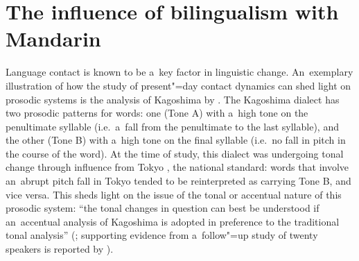 

\section{The influence of bilingualism with Mandarin}
\label{sec:theinfluenceofbilingualismwithchinese}


Language contact is known to be a~key factor in linguistic
change. An~exemplary illustration of how the study of present"=day contact dynamics can shed light on prosodic systems is the analysis of Kagoshima  by \citet{kubozono2007}. The Kagoshima dialect has two prosodic patterns for words: one (Tone A) with a~high tone on the penultimate syllable (i.e.\ a~fall from the penultimate to the last syllable), and the other (Tone B) with a~high tone on the final syllable (i.e.\ no fall in pitch in the course of the word). At the time of study, this dialect was undergoing tonal change through influence from Tokyo , the national standard: words that involve an~abrupt pitch fall in Tokyo tended to be reinterpreted as carrying Tone B, and vice versa. This sheds light on the issue of the tonal or accentual nature of this prosodic system: “the tonal changes in {question} can best be understood if an~accentual analysis of Kagoshima   is adopted in preference to the traditional tonal analysis” (\citealt[348]{kubozono2007}; supporting evidence from a~follow"=up study of twenty speakers is reported by \citealt{otaetal2016}).


